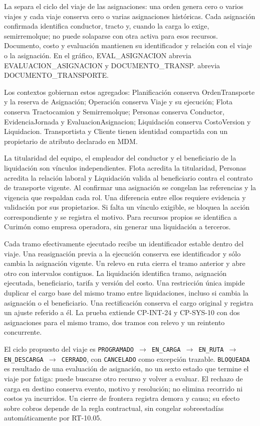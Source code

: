 La  separa el ciclo del viaje de las asignaciones: una orden genera cero o varios viajes y cada viaje conserva cero o varias asignaciones históricas. Cada asignación confirmada identifica conductor, tracto y, cuando la carga lo exige, semirremolque; no puede solaparse con otra activa para esos recursos. Documento, costo y evaluación mantienen su identificador y relación con el viaje o la asignación. En el gráfico, EVAL\_\allowbreak{}ASIGNACION abrevia EVALUACION\_\allowbreak{}ASIGNACION y DOCUMENTO\_\allowbreak{}TRANSP. abrevia DOCUMENTO\_\allowbreak{}TRANSPORTE.

Los contextos gobiernan estos agregados: Planificación conserva OrdenTransporte y la reserva de Asignación; Operación conserva Viaje y su ejecución; Flota conserva Tractocamion y Semirremolque; Personas conserva Conductor, EvidenciaJornada y EvaluacionAsignacion; Liquidación conserva CostoVersion y Liquidacion. Transportista y Cliente tienen identidad compartida con un propietario de atributo declarado en MDM.

La titularidad del equipo, el empleador del conductor y el beneficiario de la liquidación son vínculos independientes. Flota acredita la titularidad, Personas acredita la relación laboral y Liquidación valida al beneficiario contra el contrato de transporte vigente. Al confirmar una asignación se congelan las referencias y la vigencia que respaldan cada rol. Una diferencia entre ellos requiere evidencia y validación por sus propietarios. Si falta un vínculo exigible, se bloquea la acción correspondiente y se registra el motivo. Para recursos propios se identifica a Curimón como empresa operadora, sin generar una liquidación a terceros.

Cada tramo efectivamente ejecutado recibe un identificador estable dentro del viaje. Una reasignación previa a la ejecución conserva ese identificador y sólo cambia la asignación vigente. Un relevo en ruta cierra el tramo anterior y abre otro con intervalos contiguos. La liquidación identifica tramo, asignación ejecutada, beneficiario, tarifa y versión del costo. Una restricción única impide duplicar el cargo base del mismo tramo entre liquidaciones, incluso si cambia la asignación o el beneficiario. Una rectificación conserva el cargo original y registra un ajuste referido a él. La prueba extiende CP-INT-24 y CP-SYS-10 con dos asignaciones para el mismo tramo, dos tramos con relevo y un reintento concurrente.

El ciclo propuesto del viaje es \texttt{PROGRAMADO $\rightarrow$ EN\_\allowbreak{}CARGA $\rightarrow$ EN\_\allowbreak{}RUTA $\rightarrow$ EN\_\allowbreak{}DESCARGA $\rightarrow$ CERRADO}, con \texttt{CANCELADO} como excepción trazable. \texttt{BLOQUEADA} es resultado de una evaluación de asignación, no un sexto estado que termine el viaje por fatiga: puede buscarse otro recurso y volver a evaluar. El rechazo de carga en destino conserva evento, motivo y resolución; no elimina recorrido ni costos ya incurridos. Un cierre de frontera registra demora y causa; su efecto sobre cobros depende de la regla contractual, sin congelar sobreestadías automáticamente por RT-10.05.

